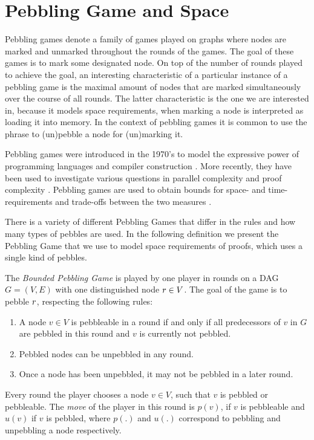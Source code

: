 \section{Pebbling Game and Space}
\label{sec:pebbling-game}

Pebbling games denote a family of games played on graphs where nodes are marked and unmarked throughout the rounds of the games.
The goal of these games is to mark some designated node.
On top of the number of rounds played to achieve the goal, an interesting characteristic of a particular instance of a pebbling game is the maximal amount of nodes that are marked simultaneously over the course of all rounds.
The latter characteristic is the one we are interested in, because it models space requirements, when marking a node is interpreted as loading it into memory.
In the context of pebbling games it is common to use the phrase to (un)pebble a node for (un)marking it.

Pebbling games were introduced in the 1970's to model the expressive power of programming languages \cite{Pippenger1980,Walker1973} and compiler construction \cite{Sethi1975}. 
More recently, they have been used to investigate various questions in parallel complexity \cite{Chan2013} and proof complexity \cite{Ben-Sasson2009,Esteban2001,Nordstroem2009}. 
Pebbling games are used to obtain bounds for space- and time- requirements and trade-offs between the two measures \cite{EmdeBoas1979,Ben-Sasson2002}.

There is a variety of different Pebbling Games that differ in the rules and how many types of pebbles are used.
In the following definition we present the Pebbling Game that we use to model space requirements of proofs, which uses a single kind of pebbles.

\begin{definition}
\label{def:pebbling-game}

The \emph{Bounded Pebbling Game} is played by one player in rounds on a DAG $G = (V,E)$ with one distinguished node $r \in V$.
The goal of the game is to pebble $r$, respecting the following rules:
\begin{enumerate}
	\item \label{rule:premises} A node $v \in V$ is pebbleable in a round if and only if all predecessors of $v$ in $G$ are pebbled in this round and $v$ is currently not pebbled.
	\item \label{rule:unpebbling} Pebbled nodes can be unpebbled in any round.
	\item \label{rule:onlyonce} Once a node has been unpebbled, it may not be pebbled in a later round.
\end{enumerate}
Every round the player chooses a node $v \in V$, such that $v$ is pebbled or pebbleable.
The \emph{move} of the player in this round is $p(v)$, if $v$ is pebbleable and $u(v)$ if $v$ is pebbled, where $p(.)$ and $u(.)$ correspond to pebbling and unpebbling a node respectively.

\end{definition}

